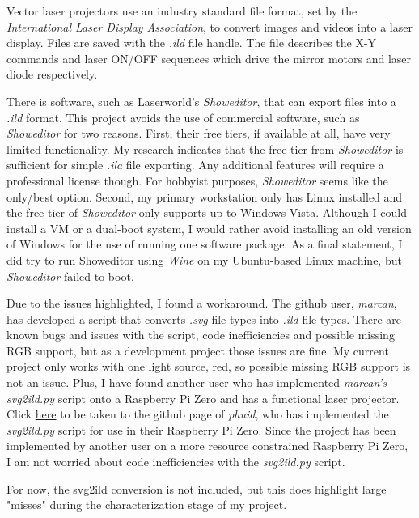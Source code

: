 \documentclass[journal]{IEEEtran}
\begin{document}
    Vector laser projectors use an industry standard file format, set by the \emph{International Laser Display Association}, to convert images and videos into a laser display.
    Files are saved with the \emph{.ild} file handle.
    The file describes the X-Y commands and laser ON/OFF sequences which drive the mirror motors and laser diode respectively.

    There is software, such as Laserworld's \emph{Showeditor}, that can export files into a \emph{.ild} format.
    This project avoids the use of commercial software, such as \emph{Showeditor} for two reasons.
    First, their free tiers, if available at all, have very limited functionality.
    My research indicates that the free-tier from \emph{Showeditor} is sufficient for simple \emph{.ila} file exporting. 
    Any additional features will require a professional license though.
    For hobbyist purposes, \emph{Showeditor} seems like the only/best option.
    Second, my primary workstation only has Linux installed and the free-tier of \emph{Showeditor} only supports up to Windows Vista.
    Although I could install a VM or a dual-boot system, I would rather avoid installing an old version of Windows for the use of running one software package.
    As a final statement, I did try to run Showeditor using \emph{Wine} on my Ubuntu-based Linux machine, but \emph{Showeditor} failed to boot.

    Due to the issues highlighted, I found a workaround. 
    The github user, \emph{marcan}, has developed a {\href{https://github.com/marcan/openlase/blob/master/tools/svg2ild.py}{script}} that converts \emph{.svg} file types into \emph{.ild} file types.
    There are known bugs and issues with the script, code inefficiencies and possible missing RGB support, but as a development project those issues are fine. 
    My current project only works with one light source, red, so possible missing RGB support is not an issue.
    Plus, I have found another user who has implemented \emph{marcan's svg2ild.py} script onto a Raspberry Pi Zero and has a functional laser projector.
    Click {\href{https://github.com/phuid/laser_projector?tab=readme-ov-file#hw}{here}} to be taken to the github page of \emph{phuid}, who has implemented the \emph{svg2ild.py} script for use in their Raspberry Pi Zero.
    Since the project has been implemented by another user on a more resource constrained Raspberry Pi Zero, I am not worried about code inefficiencies with the \emph{svg2ild.py} script.
    
    For now, the svg2ild conversion is not included, but this does highlight large "misses" during the characterization stage of my project.
\end{document}
